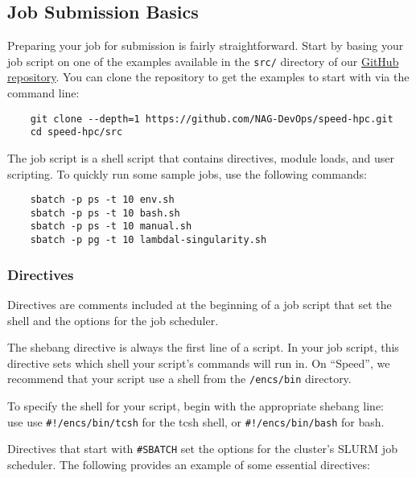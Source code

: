 \subsection{Job Submission Basics}
\label{sect:job-submission-basics}

Preparing your job for submission is fairly straightforward.
Start by basing your job script on one of the examples available in the \texttt{src/}
directory of our \href{https://github.com/NAG-DevOps/speed-hpc}{GitHub repository}.
You can clone the repository to get the examples to start with via the command line:

\begin{verbatim}
    git clone --depth=1 https://github.com/NAG-DevOps/speed-hpc.git
    cd speed-hpc/src
\end{verbatim}

\noindent The job script is a shell script that contains directives, module loads, and user scripting.
To quickly run some sample jobs, use the following commands:
\begin{verbatim}
    sbatch -p ps -t 10 env.sh
    sbatch -p ps -t 10 bash.sh
    sbatch -p ps -t 10 manual.sh
    sbatch -p pg -t 10 lambdal-singularity.sh
\end{verbatim}

\subsubsection{Directives}
\label{sect:directives}

Directives are comments included at the beginning of a job script that set the shell
and the options for the job scheduler.

The shebang directive is always the first line of a script. 
In your job script, this directive sets which shell your script's commands will run in. 
On ``Speed'', we recommend that your script use a shell from the \texttt{/encs/bin} directory.

To specify the shell for your script, begin with the appropriate shebang line:\\
use use \verb|#!/encs/bin/tcsh| for the tcsh shell, or \verb|#!/encs/bin/bash| for bash.

Directives that start with \verb|#SBATCH| set the options for the cluster's SLURM job scheduler.
The following provides an example of some essential directives:

